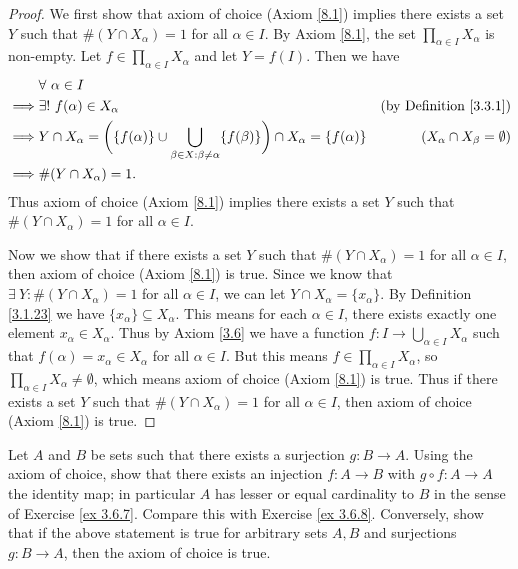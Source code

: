 \begin{proof}
    We first show that axiom of choice (Axiom \ref{8.1}) implies there exists a set \(Y\) such that \(\#(Y \cap X_{\alpha}) = 1\) for all \(\alpha \in I\).
    By Axiom \ref{8.1}, the set \(\prod_{\alpha \in I} X_{\alpha}\) is non-empty.
    Let \(f \in \prod_{\alpha \in I} X_{\alpha}\) and let \(Y = f(I)\).
    Then we have
    \begin{align*}
                 & \forall\ \alpha \in I                                                                                                                                                             \\
        \implies & \exists!\ f(\alpha) \in X_{\alpha}                                                                                                      & \text{(by Definition \ref{3.3.1})}      \\
        \implies & Y \cap X_{\alpha} = \bigg(\{f(\alpha)\} \cup \bigcup_{\beta \in X : \beta \neq \alpha} \{f(\beta)\}\bigg) \cap X_\alpha = \{f(\alpha)\} & (X_{\alpha} \cap X_{\beta} = \emptyset) \\
        \implies & \#(Y \cap X_{\alpha}) = 1.
    \end{align*}
    Thus axiom of choice (Axiom \ref{8.1}) implies there exists a set \(Y\) such that \(\#(Y \cap X_{\alpha}) = 1\) for all \(\alpha \in I\).

    Now we show that if there exists a set \(Y\) such that \(\#(Y \cap X_{\alpha}) = 1\) for all \(\alpha \in I\), then axiom of choice (Axiom \ref{8.1}) is true.
    Since we know that \(\exists\ Y : \#(Y \cap X_{\alpha}) = 1\) for all \(\alpha \in I\), we can let \(Y \cap X_{\alpha} = \{x_{\alpha}\}\).
    By Definition \ref{3.1.23} we have \(\{x_\alpha\} \subseteq X_{\alpha}\).
    This means for each \(\alpha \in I\), there exists exactly one element \(x_{\alpha} \in X_{\alpha}\).
    Thus by Axiom \ref{3.6} we have a function \(f : I \to \bigcup_{\alpha \in I} X_{\alpha}\) such that \(f(\alpha) = x_{\alpha} \in X_{\alpha}\) for all \(\alpha \in I\).
    But this means \(f \in \prod_{\alpha \in I} X_{\alpha}\), so \(\prod_{\alpha \in I} X_{\alpha} \neq \emptyset\), which means axiom of choice (Axiom \ref{8.1}) is true.
    Thus if there exists a set \(Y\) such that \(\#(Y \cap X_{\alpha}) = 1\) for all \(\alpha \in I\), then axiom of choice (Axiom \ref{8.1}) is true.
\end{proof}

\begin{exercise}\label{ex 8.4.3}
    Let \(A\) and \(B\) be sets such that there exists a surjection \(g : B \to A\).
    Using the axiom of choice, show that there exists an injection \(f: A \to B\) with \(g \circ f : A \to A\) the identity map;
    in particular \(A\) has lesser or equal cardinality to \(B\) in the sense of Exercise \ref{ex 3.6.7}.
    Compare this with Exercise \ref{ex 3.6.8}.
    Conversely, show that if the above statement is true for arbitrary sets \(A, B\) and surjections \(g : B \to A\), then the axiom of choice is true.
\end{exercise}

